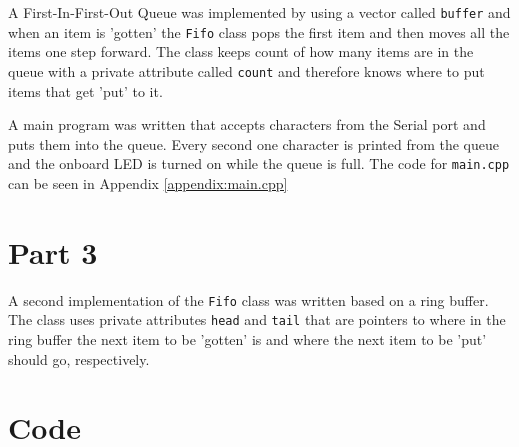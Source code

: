 \documentclass{article}
\begin{document}
A First-In-First-Out Queue was implemented by using a vector called \verb"buffer" and when an item is 'gotten' the \verb"Fifo" class pops the first item and then moves all the items one step forward. The class keeps count of how many items are in the queue with a private attribute called \verb"count" and therefore knows where to put items that get 'put' to it.




A main program was written that accepts characters from the Serial port and puts them into the queue. Every second one character is printed from the queue and the onboard LED is turned on while the queue is full. The code for \verb!main.cpp! can be seen in Appendix \ref{appendix:main.cpp}

\section*{Part 3}
A second implementation of the \verb!Fifo! class was written based on a ring buffer. The class uses private attributes \verb"head" and \verb"tail" that are pointers to where in the ring buffer the next item to be 'gotten' is and where the next item to be 'put' should go, respectively.



\newpage
\appendix
\section{Code}\label{appendix:code}

%








\end{document}

